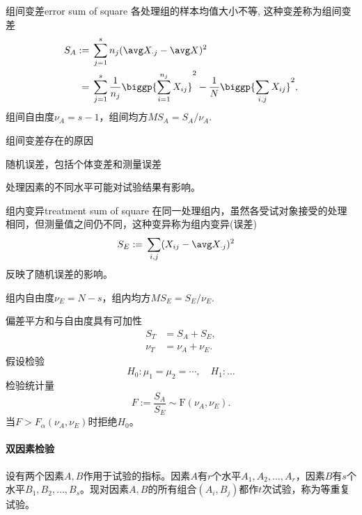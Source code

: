 \begin{definition}{组间变差}{error sum of square}
	各处理组的样本均值大小不等, 这种变差称为组间变差%
	\begin{subequations}
		\begin{align}
			S_A:={}&\sum_{j=1}^sn_j(\avg X_{\cdot j}-\avg X)^2\\\notag
			={}&\sum_{j=1}^s\frac1{n_j}\biggp{\sum_{i=1}^{n_j}X_{ij}}^2-\frac1N\biggp{\sum_{i,j}X_{ij}}^2,
		\end{align}
	\end{subequations}
	组间自由度$\nu_A=s-1$，组间均方$MS_A=S_A/\nu_A.$
\end{definition}
组间变差存在的原因
\begin{compactitem}
	\item 随机误差，包括个体变差和测量误差
	\item 处理因素的不同水平可能对试验结果有影响。
\end{compactitem}
\begin{definition}{组内变异}{treatment sum of square}
	在同一处理组内，虽然各受试对象接受的处理相同，但测量值之间仍不同，这种变异称为组内变异(误差)
	\begin{align}
		S_E:={}&\sum_{i,j}(X_{ij}-\avg X_{\cdot j})^2%
	\end{align}
	反映了随机误差的影响。

	组内自由度$\nu_E=N-s$，组内均方$MS_E=S_E/\nu_E.$
\end{definition}
偏差平方和与自由度具有可加性
\begin{subequations}
	\begin{align*}
		S_T&=S_A+S_E,\\
		\nu_T&=\nu_A+\nu_E.
	\end{align*}
\end{subequations}
假设检验
\[
	H_0:\mu_1=\mu_2=\cdots,\quad H_1:\ldots
\]
检验统计量 
\begin{equation}
	F:=\frac{S_A}{S_E}\sim\mathrm F(\nu_A,\nu_E).
\end{equation}
当$F>F_\alpha(\nu_A,\nu_E)$时拒绝$H_0$。
\paragraph{双因素检验}
设有两个因素$A,B$作用于试验的指标。因素$ A $有$ r $个水平$ A_1, A_2,\ldots, A_r$，因素$ B $有$ s $个水平$ B_1, B_2,\ldots, B_s $。现对因素$ A, B $的所有组合$(A_i, B_j)$都作$t$次试验，称为等重复试验。

